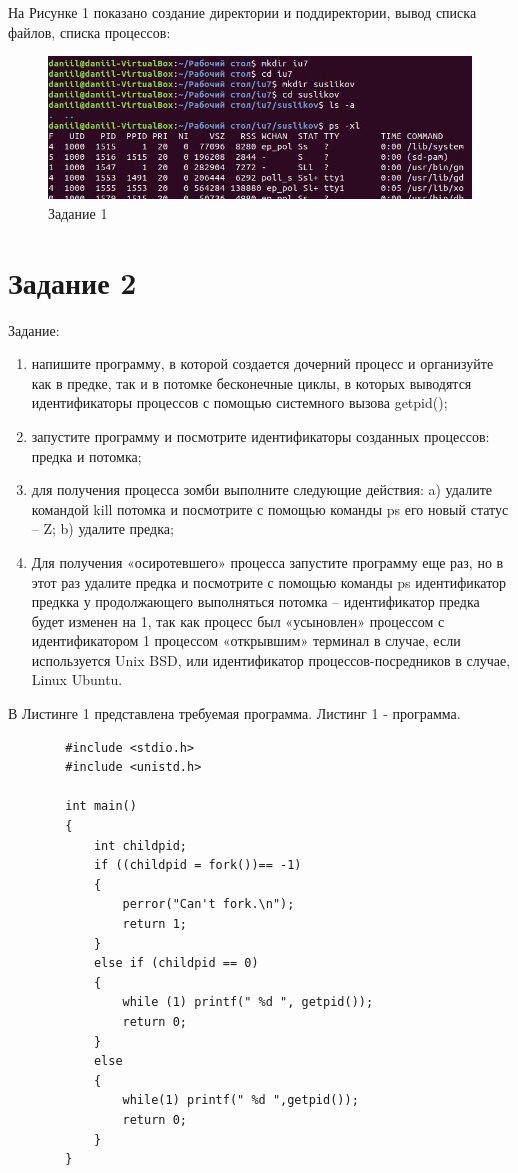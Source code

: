 \documentclass[14pt, a4paper]{extarticle}
\begin{document}
	На Рисунке 1 показано создание директории и поддиректории, вывод списка файлов, списка процессов:
	\begin{figure}[h!]
		\centering
		\includegraphics[scale=1]{source/1}
		\caption{Задание 1}
	\end{figure}
	
	\clearpage
	\section{Задание 2}
	Задание:
	\begin{enumerate}
		\item напишите программу, в которой создается дочерний процесс и организуйте как в предке, так и в
		потомке бесконечные циклы, в которых выводятся идентификаторы процессов с помощью системного
		вызова getpid();
		\item запустите программу и посмотрите идентификаторы созданных процессов: предка и потомка;
		\item для получения процесса зомби выполните следующие действия: a) удалите командой kill потомка и
		посмотрите с помощью команды ps его новый статус – Z; b) удалите предка;
		\item Для получения «осиротевшего» процесса запустите программу еще раз, но в этот раз удалите предка и посмотрите с помощью команды ps идентификатор предкка у продолжающего выполняться
		потомка – идентификатор предка будет изменен на 1, так как процесс был «усыновлен» процессом с
		идентификатором 1 процессом «открывшим» терминал в случае, если используется Unix BSD, или
		идентификатор процессов-посредников в случае, Linux Ubuntu.	
	\end{enumerate}
	
	В Листинге 1 представлена требуемая программа.\newline
	Листинг 1 - программа.
	\begin{lstlisting}		
		#include <stdio.h>
		#include <unistd.h>
		
		int main()
		{
			int childpid;
			if ((childpid = fork())== -1)
			{
				perror("Can't fork.\n");
				return 1;
			}
			else if (childpid == 0)
			{
				while (1) printf(" %d ", getpid());
				return 0;
			}
			else
			{
				while(1) printf(" %d ",getpid());
				return 0;
			}
		}
	\end{lstlisting}
\end{document}
